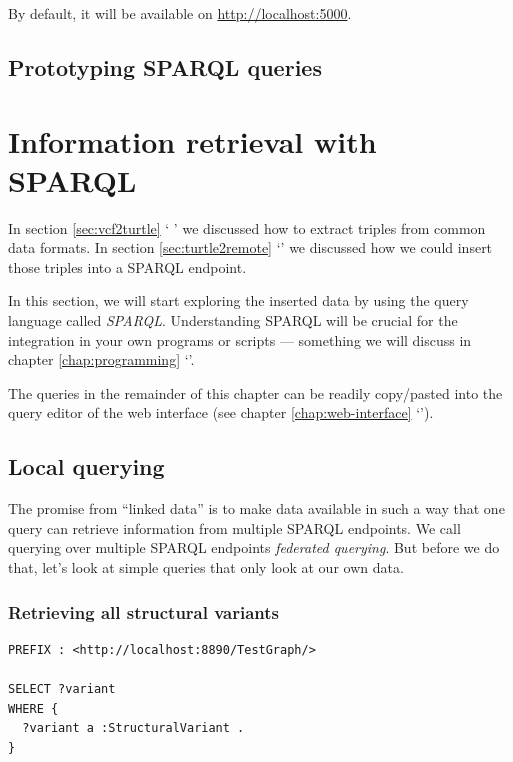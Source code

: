 \documentclass[11pt,a4paper,oneside]{book}
\begin{document}
  By default, it will be available on \url{http://localhost:5000}.

\section{Prototyping SPARQL queries}

\chapter{Information retrieval with SPARQL}

  In section \ref{sec:vcf2turtle} {\color{LinkGray}`%
  '} we discussed how to extract
  triples from common data formats.  In section \ref{sec:turtle2remote}
  {\color{LinkGray}`'}
  we discussed how we could insert those triples into a SPARQL endpoint.

  In this section, we will start exploring the inserted data by using the
  query language called \emph{SPARQL}.  Understanding SPARQL will be crucial
  for the integration in your own programs or scripts --- something we will
  discuss in chapter \ref{chap:programming}
  {\color{LinkGray}`'}.

  The queries in the remainder of this chapter can be readily copy/pasted into
  the query editor of the web interface (see chapter \ref{chap:web-interface}
  {\color{LinkGray}`'}).

\section{Local querying}

  The promise from ``linked data'' is to make data available in such a way that
  one query can retrieve information from multiple SPARQL endpoints.  We call
  querying over multiple SPARQL endpoints \emph{federated querying}.  But before
  we do that, let's look at simple queries that only look at our own data.

\subsection{Retrieving all structural variants}
\begin{siderules}
\begin{verbatim}
PREFIX : <http://localhost:8890/TestGraph/>

SELECT ?variant
WHERE {
  ?variant a :StructuralVariant .
}
\end{verbatim} 
\end{siderules}
\end{document}
